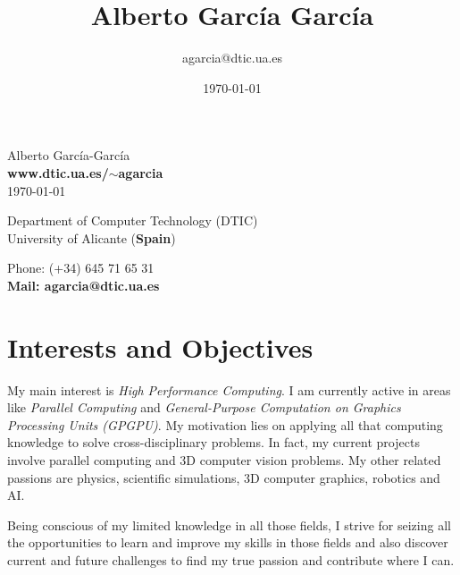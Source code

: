 \documentclass[8pt]{article}
\title{\bfseries\Huge Alberto García García}
\author{agarcia@dtic.ua.es}
\date{\today}
\begin{document}
\begin{center}
	\Huge Alberto García-García\\
	\Large \textbf{www.dtic.ua.es/$\sim$agarcia}\\
	\today
\end{center}
\bigskip
\begin{minipage}[ht]{0.7\textwidth}
Department of Computer Technology (DTIC)\\
University of Alicante (\textbf{Spain})\\
\end{minipage}
\hfill
\begin{minipage}[ht]{0.25\textwidth}
Phone: (+34) 645 71 65 31\\
\textbf{Mail: agarcia@dtic.ua.es}\\
\end{minipage}
 
\section*{Interests and Objectives}

My main interest is \emph{High Performance Computing}. I am currently active in areas like \emph{Parallel Computing} and \emph{General-Purpose Computation on Graphics Processing Units (GPGPU)}. My motivation lies on applying all that computing knowledge to solve cross-disciplinary problems. In fact, my current projects involve parallel computing and 3D computer vision problems. My other related passions are physics, scientific simulations, 3D computer graphics, robotics and AI.

Being conscious of my limited knowledge in all those fields, I strive for seizing all the opportunities to learn and improve my skills in those fields and also discover current and future challenges to find my true passion and contribute where I can.
 
\end{document}
